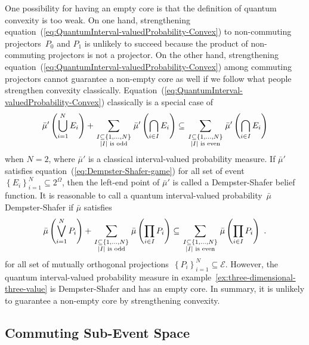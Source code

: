 \documentclass[12pt]{iopart}
\theoremstyle{plain}
\theoremstyle{definition}
\theoremstyle{remark}
\newcommand{\events}{\ensuremath{\mathcal{E}}}
\begin{document}
One possibility for having an empty core is that the definition of
quantum convexity is too weak. On one hand, strengthening equation~(\ref{eq:QuantumInterval-valuedProbability-Convex})
to non-commuting projectors~$P_{0}$ and $P_{1}$ is unlikely to
succeed because the product of non-commuting projectors is not a projector.
On the other hand, strengthening equation~(\ref{eq:QuantumInterval-valuedProbability-Convex})
among commuting projectors cannot guarantee a non-empty core as well
if we follow what people strengthen convexity classically. Equation~(\ref{eq:QuantumInterval-valuedProbability-Convex})
classically is a special case of 
\begin{equation}
\bar{\mu}'\left(\bigcup_{i=1}^{N}E_{i}\right)+\sum_{{{\scriptstyle I\subseteq\left\{ 1,\ldots,N\right\} }\atop {\scriptstyle \left|I\right|\textrm{ is odd}}}}\bar{\mu}'\left(\bigcap_{i\in I}E_{i}\right)\subseteq\sum_{{{\scriptstyle I\subseteq\left\{ 1,\ldots,N\right\} }\atop {\scriptstyle \left|I\right|\textrm{ is even}}}}\bar{\mu}'\left(\bigcap_{i\in I}E_{i}\right)\label{eq:Dempster-Shafer-game}
\end{equation}
when $N=2$, where $\bar{\mu}'$ is a classical interval-valued probability
measure. If $\bar{\mu}'$ satisfies equation~(\ref{eq:Dempster-Shafer-game})
for all set of event~$\left\{ E_{i}\right\} _{i=1}^{N}\subseteq2^{\Omega}$,
then the left-end point of $\bar{\mu}'$ is called a Dempster-Shafer
belief function. It is reasonable to call a quantum interval-valued
probability~$\bar{\mu}$ Dempster-Shafer if $\bar{\mu}$ satisfies
\begin{equation}
\bar{\mu}\left(\bigvee_{i=1}^{N}P_{i}\right)+\sum_{{{\scriptstyle I\subseteq\left\{ 1,\ldots,N\right\} }\atop {\scriptstyle \left|I\right|\textrm{ is odd}}}}\bar{\mu}\left(\prod_{i\in I}P_{i}\right)\subseteq\sum_{{{\scriptstyle I\subseteq\left\{ 1,\ldots,N\right\} }\atop {\scriptstyle \left|I\right|\textrm{ is even}}}}\bar{\mu}\left(\prod_{i\in I}P_{i}\right)\textrm{ .}\label{eq:Dempster-Shafer-game-quantum}
\end{equation}
for all set of mutually orthogonal projections~$\left\{ P_{i}\right\} _{i=1}^{N}\subseteq\events$.
However, the quantum interval-valued probability measure in example~\ref{ex:three-dimensional-three-value}
is Dempster-Shafer and has an empty core. In summary, it is unlikely
to guarantee a non-empty core by strengthening convexity.

\subsection{Commuting Sub-Event Space}
\end{document}
